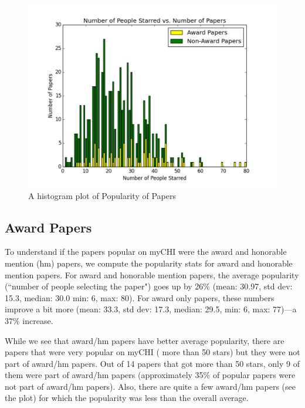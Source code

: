\documentclass{sigchi}
\begin{document}
\begin{figure}[!h]
\centering
\includegraphics[width=0.9\columnwidth]{papers_likes}
\caption{A histogram plot of Popularity of Papers}
\label{fig:A histogram plot of Number of People Starred (any single paper)}
\end{figure}



\subsection{Award Papers}

To understand if the papers popular on myCHI were the award and honorable mention (hm) papers, we compute the popularity stats for award and honorable mention papers. For award and honorable mention papers, the average popularity (``number of people selecting the paper") goes up by 26\% (mean: 30.97, std dev: 15.3, median: 30.0 min: 6, max: 80). For award only papers, these numbers improve a bit more (mean: 33.3, std dev: 17.3,  median: 29.5, min: 6, max: 77)---a 37\% increase.

While we see that award/hm papers have better average popularity,  there are papers that were very popular on myCHI ( more than 50 stars) but they were not part of award/hm papers. Out of 14 papers that got more than 50 stars, only 9 of them were part of award/hm papers (approximately 35\% of popular papers were not part of award/hm papers). Also, there are quite a few award/hm papers (see the plot) for which the popularity was less than the overall average.
\end{document}
